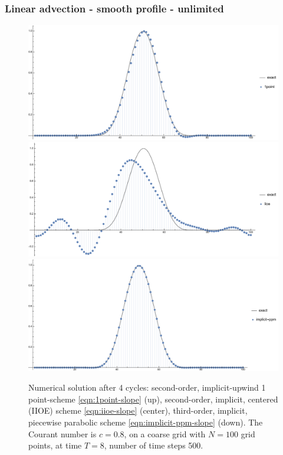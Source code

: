\documentclass[../thesis.tex]{subfiles}
\begin{document}
\subsubsection{Linear advection - smooth profile - unlimited}
\begin{figure}[H]
	\centering
	\includegraphics[width=\textwidth]{fig-1point-c0p8-T8-limit0-smooth.pdf}
	\includegraphics[width=\textwidth]{fig-iioe-c0p8-T8-limit0-smooth.pdf}
	\includegraphics[width=\textwidth]{fig-implicit-ppm-c0p8-T8-limit0-smooth.pdf}
	\caption{Numerical solution after 4 cycles: second-order, implicit-upwind 1 point-scheme \eqref{eqn:1point-slope} (up), second-order, implicit, centered (IIOE) scheme \eqref{eqn:iioe-slope} (center), third-order, implicit, piecewise parabolic scheme \eqref{eqn:implicit-ppm-slope} (down). The Courant number is \(c = 0.8\), on a coarse grid with \(N = 100\) grid points, at time \(T = 8\), number of time steps 500.}
	\label{fig:c0p8-T8-limit0-smooth}
\end{figure}
\end{document}

